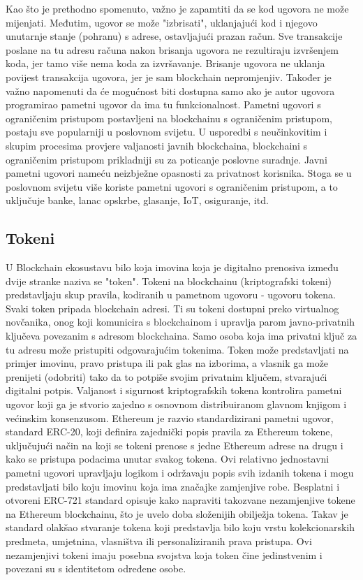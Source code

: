 \documentclass[times, utf8, diplomski]{fer}
\begin{document}
Kao što je prethodno spomenuto, važno je zapamtiti da se kod ugovora ne može mijenjati. Međutim, ugovor se može "izbrisati", uklanjajući kod i njegovo unutarnje stanje (pohranu) s adrese, ostavljajući prazan račun. Sve transakcije poslane na tu adresu računa nakon brisanja ugovora ne rezultiraju izvršenjem koda, jer tamo više nema koda za izvršavanje. Brisanje ugovora ne uklanja povijest transakcija ugovora,  jer je sam blockchain nepromjenjiv. Također je važno napomenuti da će mogućnost biti dostupna samo ako je autor ugovora programirao pametni ugovor da ima tu funkcionalnost.
Pametni ugovori s ograničenim pristupom postavljeni na blockchainu s ograničenim pristupom, postaju sve popularniji u poslovnom svijetu. U usporedbi s neučinkovitim i skupim procesima provjere valjanosti javnih blockchaina, blockchaini s ograničenim pristupom prikladniji su za poticanje poslovne suradnje. Javni pametni ugovori nameću neizbježne opasnosti za privatnost korisnika. Stoga se u poslovnom svijetu više koriste pametni ugovori s ograničenim pristupom, a to uključuje banke, lanac opskrbe, glasanje, IoT, osiguranje, itd.  \cite{ethereum-smart-contract}

\subsection{Tokeni}

U Blockchain ekosustavu bilo koja imovina koja je digitalno prenosiva između dvije stranke naziva se "token". Tokeni na blockchainu (kriptografski tokeni) predstavljaju skup pravila, kodiranih u pametnom ugovoru - ugovoru tokena. Svaki token pripada blockchain adresi. Ti su tokeni dostupni preko virtualnog novčanika, onog koji komunicira s blockchainom i upravlja parom javno-privatnih ključeva povezanim s adresom blockchaina. Samo osoba koja ima privatni ključ za tu adresu može pristupiti odgovarajućim tokenima. Token može predstavljati na primjer imovinu, pravo pristupa ili pak glas na izborima, a vlasnik ga može prenijeti (odobriti) tako da to potpiše svojim privatnim ključem, stvarajući digitalni potpis. Valjanost i sigurnost kriptografskih tokena kontrolira pametni ugovor koji ga je stvorio zajedno s osnovnom distribuiranom glavnom knjigom i većinskim konsenzusom.
Ethereum je razvio standardizirani pametni ugovor, standard ERC-20, koji definira zajednički popis pravila za Ethereum tokene, uključujući način na koji se tokeni prenose s jedne Ethereum adrese na drugu i kako se pristupa podacima unutar svakog tokena. Ovi relativno jednostavni pametni ugovori upravljaju logikom i održavaju popis svih izdanih tokena i mogu predstavljati bilo koju imovinu koja ima značajke zamjenjive robe.  \cite{erc20}
Besplatni i otvoreni ERC-721 standard opisuje kako napraviti takozvane nezamjenjive tokene na Ethereum blockchainu, što je uvelo doba složenijih obilježja tokena.  Takav je standard olakšao stvaranje tokena koji predstavlja bilo koju vrstu kolekcionarskih predmeta, umjetnina, vlasništva ili personaliziranih prava pristupa. Ovi nezamjenjivi tokeni imaju posebna svojstva koja token čine jedinstvenim i povezani su s identitetom određene osobe. \cite{erc721}
\end{document}
